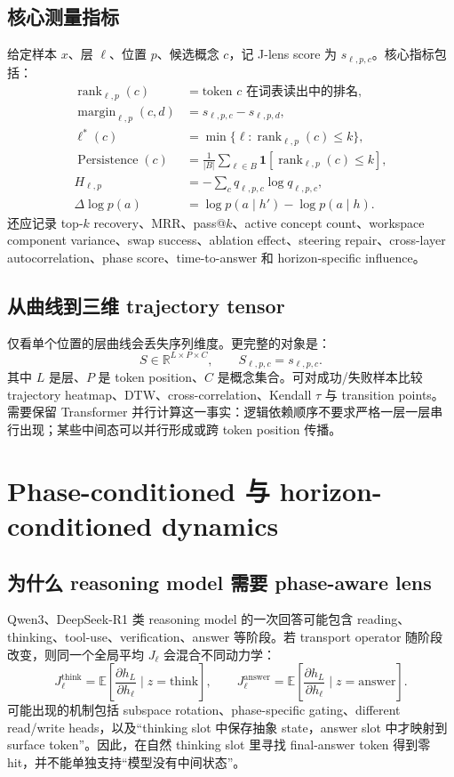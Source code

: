 \documentclass[10.5pt,a4paper]{ctexart}
\begin{document}
\subsection{核心测量指标}
给定样本 $x$、层 $\ell$、位置 $p$、候选概念 $c$，记 J-lens score 为 $s_{\ell,p,c}$。核心指标包括：
\begin{align*}
\operatorname{rank}_{\ell,p}(c)&=\text{token }c\text{ 在词表读出中的排名},\\
\operatorname{margin}_{\ell,p}(c,d)&=s_{\ell,p,c}-s_{\ell,p,d},\\
\ell^*(c)&=\min\{\ell:\operatorname{rank}_{\ell,p}(c)\le k\},\\
\operatorname{Persistence}(c)&=\frac{1}{|B|}\sum_{\ell\in B}\mathbf 1[\operatorname{rank}_{\ell,p}(c)\le k],\\
H_{\ell,p}&=-\sum_c q_{\ell,p,c}\log q_{\ell,p,c},\\
\Delta\log p(a)&=\log p(a\mid h')-\log p(a\mid h).
\end{align*}
还应记录 top-$k$ recovery、MRR、pass@$k$、active concept count、workspace component variance、swap success、ablation effect、steering repair、cross-layer autocorrelation、phase score、time-to-answer 和 horizon-specific influence。

\subsection{从曲线到三维 trajectory tensor}
仅看单个位置的层曲线会丢失序列维度。更完整的对象是：
\[
S\in\mathbb{R}^{L\times P\times C},\qquad
S_{\ell,p,c}=s_{\ell,p,c}.
\]
其中 $L$ 是层、$P$ 是 token position、$C$ 是概念集合。可对成功/失败样本比较 trajectory heatmap、DTW、cross-correlation、Kendall $\tau$ 与 transition points。需要保留 Transformer 并行计算这一事实：逻辑依赖顺序不要求严格一层一层串行出现；某些中间态可以并行形成或跨 token position 传播。

\section{Phase-conditioned 与 horizon-conditioned dynamics}

\subsection{为什么 reasoning model 需要 phase-aware lens}
Qwen3、DeepSeek-R1 类 reasoning model 的一次回答可能包含 reading、thinking、tool-use、verification、answer 等阶段。若 transport operator 随阶段改变，则同一个全局平均 $J_\ell$ 会混合不同动力学：
\[
J_\ell^{\mathrm{think}}
=
\mathbb E\left[
\frac{\partial h_L}{\partial h_\ell}\mid z=\mathrm{think}
\right],\qquad
J_\ell^{\mathrm{answer}}
=
\mathbb E\left[
\frac{\partial h_L}{\partial h_\ell}\mid z=\mathrm{answer}
\right].
\]
可能出现的机制包括 subspace rotation、phase-specific gating、different read/write heads，以及“thinking slot 中保存抽象 state，answer slot 中才映射到 surface token”。因此，在自然 thinking slot 里寻找 final-answer token 得到零 hit，并不能单独支持“模型没有中间状态”。
\end{document}
